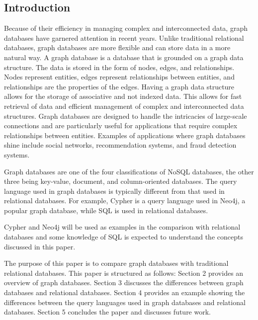 
\subsection{Introduction}
Because of their efficiency in managing complex and interconnected data, graph databases have garnered attention in recent years. Unlike traditional relational databases, graph databases are more flexible and can store data in a more natural way. A graph database is a database that is grounded on a graph data structure. The data is stored in the form of nodes, edges, and relationships. Nodes represent entities, edges represent relationships between entities, and relationships are the properties of the edges. Having a graph data structure allows for the storage of associative and not indexed data. This allows for fast retrieval of data and efficient management of complex and interconnected data structures. Graph databases are designed to handle the intricacies of large-scale connections and are particularly useful for applications that require complex relationships between entities. Examples of applications where graph databases shine include social networks, recommendation systems, and fraud detection systems. 

Graph databases are one of the four classifications of NoSQL databases, the other three being key-value, document, and column-oriented databases. The query language used in graph databases is typically different from that used in relational databases. For example, Cypher is a query language used in Neo4j, a popular graph database, while SQL is used in relational databases. 

Cypher and Neo4j will be used as examples in the comparison with relational databases and some knowledge of SQL is expected to understand the concepts discussed in this paper.


The purpose of this paper is to compare graph databases with traditional relational databases. This paper is structured as follows: Section 2 provides an overview of graph databases. Section 3 discusses the differences between graph databases and relational databases. Section 4 provides an example showing the differences between the query languages used in graph databases and relational databases. Section 5 concludes the paper and discusses future work.





